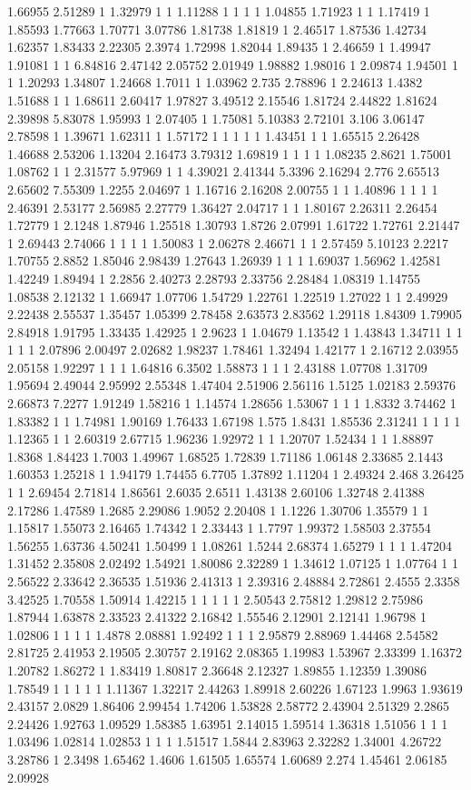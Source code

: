 1.66955 2.51289 1 1.32979 1 1 1.11288 1 1 1 1 1.04855 1.71923 1 1 1.17419 1 1.85593 1.77663 1.70771 3.07786 1.81738 1.81819 1 2.46517 1.87536 1.42734 1.62357 1.83433 2.22305 2.3974 1.72998 1.82044 1.89435 1 2.46659 1 1.49947 1.91081 1 1 6.84816 2.47142 2.05752 2.01949 1.98882 1.98016 1 2.09874 1.94501 1 1 1.20293 1.34807 1.24668 1.7011 1 1.03962 2.735 2.78896 1 2.24613 1.4382 1.51688 1 1 1.68611 2.60417 1.97827 3.49512 2.15546 1.81724 2.44822 1.81624 2.39898 5.83078 1.95993 1 2.07405 1 1.75081 5.10383 2.72101 3.106 3.06147 2.78598 1 1.39671 1.62311 1 1.57172 1 1 1 1 1 1.43451 1 1 1.65515 2.26428 1.46688 2.53206 1.13204 2.16473 3.79312 1.69819 1 1 1 1 1.08235 2.8621 1.75001 1.08762 1 1 2.31577 5.97969 1 1 4.39021 2.41344 5.3396 2.16294 2.776 2.65513 2.65602 7.55309 1.2255 2.04697 1 1.16716 2.16208 2.00755 1 1 1.40896 1 1 1 1 2.46391 2.53177 2.56985 2.27779 1.36427 2.04717 1 1 1.80167 2.26311 2.26454 1.72779 1 2.1248 1.87946 1.25518 1.30793 1.8726 2.07991 1.61722 1.72761 2.21447 1 2.69443 2.74066 1 1 1 1 1.50083 1 2.06278 2.46671 1 1 2.57459 5.10123 2.2217 1.70755 2.8852 1.85046 2.98439 1.27643 1.26939 1 1 1 1.69037 1.56962 1.42581 1.42249 1.89494 1 2.2856 2.40273 2.28793 2.33756 2.28484 1.08319 1.14755 1.08538 2.12132 1 1.66947 1.07706 1.54729 1.22761 1.22519 1.27022 1 1 2.49929 2.22438 2.55537 1.35457 1.05399 2.78458 2.63573 2.83562 1.29118 1.84309 1.79905 2.84918 1.91795 1.33435 1.42925 1 2.9623 1 1.04679 1.13542 1 1.43843 1.34711 1 1 1 1 1 2.07896 2.00497 2.02682 1.98237 1.78461 1.32494 1.42177 1 2.16712 2.03955 2.05158 1.92297 1 1 1 1.64816 6.3502 1.58873 1 1 1 2.43188 1.07708 1.31709 1.95694 2.49044 2.95992 2.55348 1.47404 2.51906 2.56116 1.5125 1.02183 2.59376 2.66873 7.2277 1.91249 1.58216 1 1.14574 1.28656 1.53067 1 1 1 1.8332 3.74462 1 1.83382 1 1 1.74981 1.90169 1.76433 1.67198 1.575 1.8431 1.85536 2.31241 1 1 1 1 1.12365 1 1 2.60319 2.67715 1.96236 1.92972 1 1 1.20707 1.52434 1 1 1.88897 1.8368 1.84423 1.7003 1.49967 1.68525 1.72839 1.71186 1.06148 2.33685 2.1443 1.60353 1.25218 1 1.94179 1.74455 6.7705 1.37892 1.11204 1 2.49324 2.468 3.26425 1 1 2.69454 2.71814 1.86561 2.6035 2.6511 1.43138 2.60106 1.32748 2.41388 2.17286 1.47589 1.2685 2.29086 1.9052 2.20408 1 1.1226 1.30706 1.35579 1 1 1.15817 1.55073 2.16465 1.74342 1 2.33443 1 1.7797 1.99372 1.58503 2.37554 1.56255 1.63736 4.50241 1.50499 1 1.08261 1.5244 2.68374 1.65279 1 1 1 1.47204 1.31452 2.35808 2.02492 1.54921 1.80086 2.32289 1 1.34612 1.07125 1 1.07764 1 1 2.56522 2.33642 2.36535 1.51936 2.41313 1 2.39316 2.48884 2.72861 2.4555 2.3358 3.42525 1.70558 1.50914 1.42215 1 1 1 1 1 2.50543 2.75812 1.29812 2.75986 1.87944 1.63878 2.33523 2.41322 2.16842 1.55546 2.12901 2.12141 1.96798 1 1.02806 1 1 1 1 1.4878 2.08881 1.92492 1 1 1 2.95879 2.88969 1.44468 2.54582 2.81725 2.41953 2.19505 2.30757 2.19162 2.08365 1.19983 1.53967 2.33399 1.16372 1.20782 1.86272 1 1.83419 1.80817 2.36648 2.12327 1.89855 1.12359 1.39086 1.78549 1 1 1 1 1 1.11367 1.32217 2.44263 1.89918 2.60226 1.67123 1.9963 1.93619 2.43157 2.0829 1.86406 2.99454 1.74206 1.53828 2.58772 2.43904 2.51329 2.2865 2.24426 1.92763 1.09529 1.58385 1.63951 2.14015 1.59514 1.36318 1.51056 1 1 1 1.03496 1.02814 1.02853 1 1 1 1.51517 1.5844 2.83963 2.32282 1.34001 4.26722 3.28786 1 2.3498 1.65462 1.4606 1.61505 1.65574 1.60689 2.274 1.45461 2.06185 2.09928 